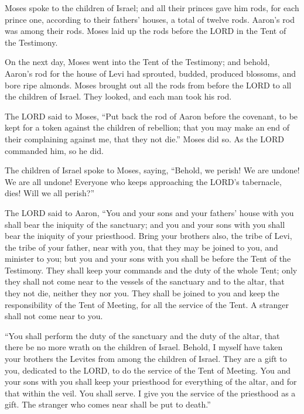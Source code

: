 \myverse{}Moses spoke to the children of Israel; and all their princes gave
him rods, for each prince one, according to their fathers’ houses, a total of twelve rods. Aaron’s rod
was among their rods.
\myverse{}Moses laid up the rods before the LORD in the Tent of the Testimony.


\myverse{}On the next day, Moses went into the Tent of the Testimony; and
behold, Aaron’s rod for the house of Levi had sprouted, budded, produced blossoms, and bore ripe almonds.
\myverse{}Moses brought out all the rods from before the LORD to all the children of
Israel. They looked, and each man took his rod.


\myverse{}The LORD said to Moses, “Put back the rod of Aaron before the
covenant, to be kept for a token against the children of rebellion; that you may make an end of their
complaining against me, that they not die.”
\myverse{}Moses did so. As the LORD commanded him, so he did.


\myverse{}The children of Israel spoke to Moses, saying, “Behold, we perish!
We are undone! We are all undone!
\myverse{}Everyone who keeps approaching the LORD’s tabernacle, dies! Will we all perish?”


\mychapter{} \myverse*{}The LORD said to Aaron, “You and your sons and your fathers’ house
with you shall bear the iniquity of the sanctuary; and you and your sons with you shall bear the iniquity
of your priesthood.
\myverse{}Bring your brothers also, the tribe of Levi, the tribe of your father, near
with you, that they may be joined to you, and minister to you; but you and your sons with you shall be
before the Tent of the Testimony.
\myverse{}They shall keep your commands and the duty of the whole Tent; only they shall
not come near to the vessels of the sanctuary and to the altar, that they not die, neither they nor you.
\myverse{}They shall be joined to you and keep the responsibility of the Tent of Meeting,
for all the service of the Tent. A stranger shall not come near to you.


\myverse{}“You shall perform the duty of the sanctuary and the duty of the
altar, that there be no more wrath on the children of Israel.
\myverse{}Behold, I myself have taken your brothers the Levites from among the children
of Israel. They are a gift to you, dedicated to the LORD, to do the service of the Tent of Meeting.
\myverse{}You and your sons with you shall keep your priesthood for everything of the
altar, and for that within the veil. You shall serve. I give you the service of the priesthood as a gift.
The stranger who comes near shall be put to death.”


